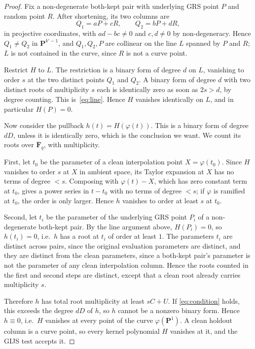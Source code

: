 \begin{proof}
    Fix a non-degenerate both-kept pair with underlying GRS point
    $P$ and random point $R$. After shortening, its two columns are
    \[
        Q_1 = aP + cR, \qquad Q_2 = bP + dR,
    \]
    in projective coordinates, with $ad - bc \ne 0$ and $c, d \ne 0$
    by non-degeneracy. Hence $Q_1 \ne Q_2$ in $\mathbf{P}^{k'-1}$,
    and $Q_1, Q_2, P$ are collinear on the line $L$ spanned by $P$
    and $R$; $L$ is not contained in the curve, since $R$ is not a
    curve point.

    Restrict $H$ to $L$. The restriction is a binary form of degree
    $d$ on $L$, vanishing to order $s$ at the two distinct points
    $Q_1$ and $Q_2$. A binary form of degree $d$ with two distinct
    roots of multiplicity $s$ each is identically zero as soon as
    $2s > d$, by degree counting. This is~\eqref{eq:line}. Hence
    $H$ vanishes identically on $L$, and in particular $H(P) = 0$.

    Now consider the pullback $h(t) = H(\varphi(t))$. This is a binary
    form of degree $dD$, unless it is identically zero, which is the
    conclusion we want. We count its roots over
    $\overline{\mathbf{F}}_q$, with multiplicity.

    First, let $t_0$ be the parameter of a clean interpolation point
    $X = \varphi(t_0)$. Since $H$ vanishes to order $s$ at $X$ in
    ambient space, its Taylor expansion at $X$ has no terms of degree
    $< s$. Composing with $\varphi(t) - X$, which has zero constant
    term at $t_0$, gives a power series in $t - t_0$ with no terms of
    degree $< s$; if $\varphi$ is ramified at $t_0$, the order is only
    larger. Hence $h$ vanishes to order at least $s$ at $t_0$.

    Second, let $t_i$ be the parameter of the underlying GRS point
    $P_i$ of a non-degenerate both-kept pair. By the line argument
    above, $H(P_i) = 0$, so $h(t_i) = 0$, i.e.\ $h$ has a root at
    $t_i$ of order at least $1$. The parameters $t_i$ are distinct
    across pairs, since the original evaluation parameters are
    distinct, and they are distinct from the clean parameters, since
    a both-kept pair's parameter is not the parameter of any clean
    interpolation column. Hence the roots counted in the first and
    second steps are distinct, except that a clean root already
    carries multiplicity $s$.

    Therefore $h$ has total root multiplicity at least $sC + U$.
    If \eqref{eq:condition} holds, this exceeds the degree $dD$ of
    $h$, so $h$ cannot be a nonzero binary form. Hence $h \equiv 0$,
    i.e.\ $H$ vanishes at every point of the curve
    $\varphi(\mathbf{P}^1)$. A clean holdout column is a curve
    point, so every kernel polynomial $H$ vanishes at it, and the
    GIJS test accepts it.
\end{proof}

